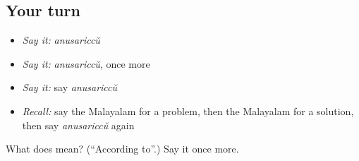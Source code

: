 \subsection*{Your turn}
\begin{itemize}
\raggedright
  \item \emph{Say it:} \emph{anusariccŭ}
  \item \emph{Say it:} \emph{anusariccŭ}, once more
  \item \emph{Say it:} say \emph{anusariccŭ}
  \item \emph{Recall:} say the Malayalam for a problem, then the Malayalam for a solution, then say \emph{anusariccŭ} again
\end{itemize}

\begin{tcolorbox}[breakable,colback=teal!4,colframe=teal!35!black,title={Before you move on}]
What does  mean? (\textquotedblleft{}According to\textquotedblright{}.) Say it once more.
\end{tcolorbox}
